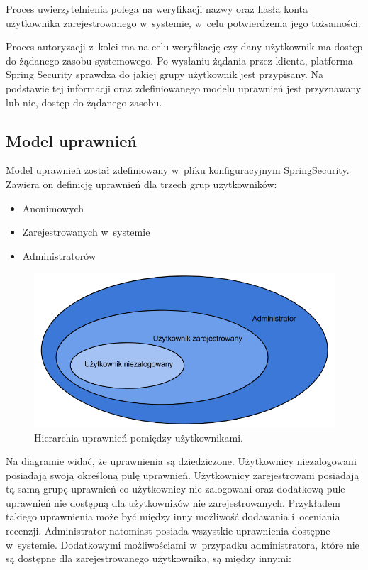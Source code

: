 Proces uwierzytelnienia polega na weryfikacji nazwy oraz hasła konta użytkownika zarejestrowanego w~systemie, w~celu potwierdzenia jego tożsamości. 

Proces autoryzacji z~kolei ma na celu weryfikację czy dany użytkownik ma dostęp do żądanego zasobu systemowego. Po wysłaniu żądania przez klienta, platforma Spring Security sprawdza do jakiej grupy użytkownik jest przypisany. Na podstawie tej informacji oraz zdefiniowanego modelu uprawnień jest przyznawany lub nie, dostęp do żądanego zasobu.

\subsection{Model uprawnień}

Model uprawnień został zdefiniowany w~pliku konfiguracyjnym SpringSecurity. Zawiera on definicję uprawnień dla  trzech grup użytkowników:

\begin{itemize}
\item Anonimowych
\item Zarejestrowanych w~systemie
\item Administratorów
\end{itemize}

\begin{figure}[H]
	\centering
	\includegraphics[width=1.00\textwidth]{images/hierarchia_uprawnien.png}
	\caption{Hierarchia uprawnień pomiędzy użytkownikami.}
\end{figure}

Na diagramie widać, że uprawnienia są dziedziczone. Użytkownicy niezalogowani posiadają swoją określoną pulę uprawnień. Użytkownicy zarejestrowani posiadają tą samą grupę uprawnień co użytkownicy nie zalogowani oraz dodatkową pule uprawnień nie dostępną dla użytkowników nie zarejestrowanych. Przykładem takiego uprawnienia może być między inny możliwość dodawania i~oceniania recenzji. Administrator natomiast posiada wszystkie uprawnienia dostępne w~systemie. Dodatkowymi możliwościami w~przypadku administratora, które nie są dostępne dla zarejestrowanego użytkownika, są między innymi:

